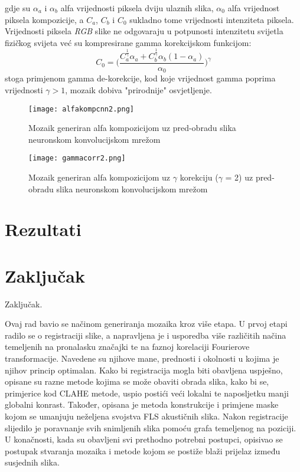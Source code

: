 \documentclass[times, utf8, diplomski]{fer}
\begin{document}
gdje su $\alpha_a$ i $\alpha_b$ alfa vrijednosti piksela dviju ulaznih slika, $\alpha_0$ alfa vrijednost piksela kompozicije, a $C_a$, $C_b$ i $C_0$ sukladno tome vrijednosti intenziteta piksela. Vrijednosti piksela \textit{RGB} slike ne odgovaraju u potpunosti intenzitetu svijetla fizičkog svijeta već su kompresirane gamma korekcijskom funkcijom:
$$ C_0 = \bigg ( \frac{C_a^{\frac{1}{\gamma}} \alpha_a + C_b^{\frac{1}{\gamma}} \alpha_b(1-\alpha_a)}{\alpha_0} \bigg )^\gamma $$
stoga primjenom gamma de-korekcije, kod koje vrijednost gamma poprima vrijednosti $ \gamma >1$, mozaik dobiva "prirodnije" osvjetljenje.
\begin{figure}[!tbh]
\centering
\texttt{[image: alfakompcnn2.png]}
		\caption{ Mozaik generiran alfa kompozicijom uz pred-obradu slika neuronskom konvolucijskom mrežom}
		\label{fig:Mozaik generiran alfa kompozicijom}
\end{figure}
\begin{figure}[!tbh]
\centering
\texttt{[image: gammacorr2.png]}
		\caption{ Mozaik generiran alfa kompozicijom uz $\gamma$ korekciju ($\gamma$ = 2) uz pred-obradu slika neuronskom konvolucijskom mrežom}
		\label{fig:Mozaik generiran alfa kompozicijom uz gamma korekciju}
\end{figure}
\chapter{Rezultati}
\chapter{Zaključak}
Zaključak.




\begin{sazetak}
Ovaj rad bavio se načinom generiranja mozaika kroz više etapa. U prvoj etapi radilo se o registraciji slike, a napravljena je i usporedba više različitih načina temeljenih na pronalasku značajki te na faznoj korelaciji Fourierove transformacije. Navedene su njihove mane, prednosti i okolnosti u kojima je njihov princip optimalan. Kako bi registracija mogla biti obavljena uspješno, opisane su razne metode kojima se može obaviti obrada slika, kako bi se, primjerice kod CLAHE metode, uspio postići veći lokalni te naposljetku manji globalni konrast. Također, opisana je metoda konstrukcije i primjene maske kojom se umanjuju neželjena svojstva FLS akustičnih slika. Nakon registracije slijedilo je poravnanje svih snimljenih slika pomoću grafa temeljenog na poziciji. U konačnosti, kada su obavljeni svi prethodno potrebni postupci, opisivao se postupak stvaranja mozaika i metode kojom se postiže blaži prijelaz između susjednih slika.

\end{sazetak}
\end{document}
